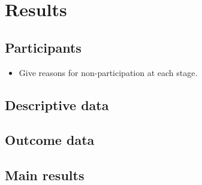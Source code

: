 \documentclass[
  letterpaper,
  DIV=11,
  numbers=noendperiod]{scrartcl}
\providecommand{\tightlist}{%
  \setlength{\itemsep}{0pt}\setlength{\parskip}{0pt}}\usepackage{longtable,booktabs,array}
\begin{document}
\section{Results}\label{sec-res}

\subsection{Participants}\label{sec-res-participants}

\begin{itemize}
\tightlist
\item
  Give reasons for non-participation at each stage.
\end{itemize}

\subsection{Descriptive data}\label{sec-res-pop-desc}

\subsection{Outcome data}\label{sec-res-out-desc}

\subsection{Main results}\label{sec-res-main}
\end{document}
